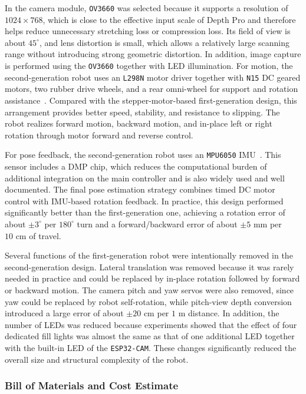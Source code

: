 \documentclass[12pt]{interim_report}
\begin{document}
In the camera module, \texttt{OV3660} was selected because it supports a resolution of \(1024 \times 768\), which is close to the effective input scale of Depth Pro and therefore helps reduce unnecessary stretching loss or compression loss. Its field of view is about \(45^\circ\), and lens distortion is small, which allows a relatively large scanning range without introducing strong geometric distortion. In addition, image capture is performed using the \texttt{OV3660} together with LED illumination. For motion, the second-generation robot uses an \texttt{L298N} motor driver together with \texttt{N15} DC geared motors, two rubber drive wheels, and a rear omni-wheel for support and rotation assistance~\cite{st_l298}. Compared with the stepper-motor-based first-generation design, this arrangement provides better speed, stability, and resistance to slipping. The robot realizes forward motion, backward motion, and in-place left or right rotation through motor forward and reverse control.

For pose feedback, the second-generation robot uses an \texttt{MPU6050} IMU~\cite{invensense_mpu6050}. This sensor includes a DMP chip, which reduces the computational burden of additional integration on the main controller and is also widely used and well documented. The final pose estimation strategy combines timed DC motor control with IMU-based rotation feedback. In practice, this design performed significantly better than the first-generation one, achieving a rotation error of about \(\pm 3^\circ\) per \(180^\circ\) turn and a forward/backward error of about \(\pm 5\text{ mm}\) per \(10\text{ cm}\) of travel.

Several functions of the first-generation robot were intentionally removed in the second-generation design. Lateral translation was removed because it was rarely needed in practice and could be replaced by in-place rotation followed by forward or backward motion. The camera pitch and yaw servos were also removed, since yaw could be replaced by robot self-rotation, while pitch-view depth conversion introduced a large error of about \(\pm 20\text{ cm}\) per \(1\text{ m}\) distance. In addition, the number of LEDs was reduced because experiments showed that the effect of four dedicated fill lights was almost the same as that of one additional LED together with the built-in LED of the \texttt{ESP32-CAM}. These changes significantly reduced the overall size and structural complexity of the robot.


\subsubsection{Bill of Materials and Cost Estimate}
\label{subsubsec:bill-of-materials-cost-estimate-zhuyu-dong}
\label{subsec:bom-cost-estimate-zhuyu-dong}
\end{document}
